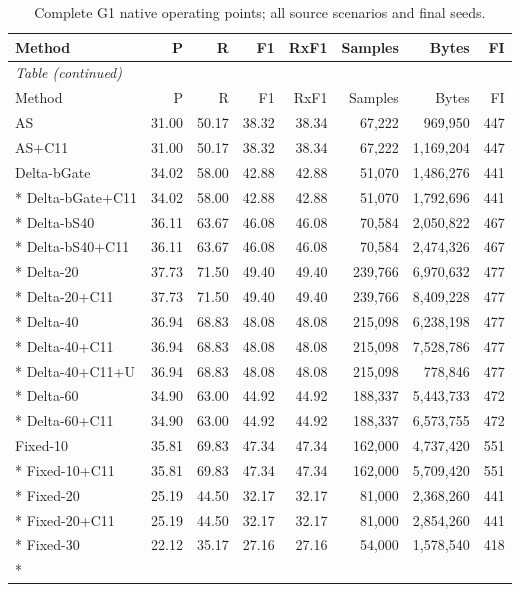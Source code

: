 \begin{small}\setlength{\tabcolsep}{3pt}\begin{longtable}{lrrrrrrr}
\caption{Complete G1 native operating points; all source scenarios and final seeds.}\label{tab:nativecomplete}\\
\toprule Method & P & R & F1 & RxF1 & Samples & Bytes & FI \\\midrule\endfirsthead\multicolumn{8}{l}{\textit{Table \thetable{} (continued)}}\\\toprule Method & P & R & F1 & RxF1 & Samples & Bytes & FI \\\midrule\endhead
AS & 31.00 & 50.17 & 38.32 & 38.34 & 67,222 & 969,950 & 447 \\
AS+C11 & 31.00 & 50.17 & 38.32 & 38.34 & 67,222 & 1,169,204 & 447 \\
Delta-bGate & 34.02 & 58.00 & 42.88 & 42.88 & 51,070 & 1,486,276 & 441 \\*
Delta-bGate+C11 & 34.02 & 58.00 & 42.88 & 42.88 & 51,070 & 1,792,696 & 441 \\*
Delta-bS40 & 36.11 & 63.67 & 46.08 & 46.08 & 70,584 & 2,050,822 & 467 \\*
Delta-bS40+C11 & 36.11 & 63.67 & 46.08 & 46.08 & 70,584 & 2,474,326 & 467 \\*
Delta-20 & 37.73 & 71.50 & 49.40 & 49.40 & 239,766 & 6,970,632 & 477 \\*
Delta-20+C11 & 37.73 & 71.50 & 49.40 & 49.40 & 239,766 & 8,409,228 & 477 \\*
Delta-40 & 36.94 & 68.83 & 48.08 & 48.08 & 215,098 & 6,238,198 & 477 \\*
Delta-40+C11 & 36.94 & 68.83 & 48.08 & 48.08 & 215,098 & 7,528,786 & 477 \\*
Delta-40+C11+U & 36.94 & 68.83 & 48.08 & 48.08 & 215,098 & 778,846 & 477 \\*
Delta-60 & 34.90 & 63.00 & 44.92 & 44.92 & 188,337 & 5,443,733 & 472 \\*
Delta-60+C11 & 34.90 & 63.00 & 44.92 & 44.92 & 188,337 & 6,573,755 & 472 \\
Fixed-10 & 35.81 & 69.83 & 47.34 & 47.34 & 162,000 & 4,737,420 & 551 \\*
Fixed-10+C11 & 35.81 & 69.83 & 47.34 & 47.34 & 162,000 & 5,709,420 & 551 \\*
Fixed-20 & 25.19 & 44.50 & 32.17 & 32.17 & 81,000 & 2,368,260 & 441 \\*
Fixed-20+C11 & 25.19 & 44.50 & 32.17 & 32.17 & 81,000 & 2,854,260 & 441 \\*
Fixed-30 & 22.12 & 35.17 & 27.16 & 27.16 & 54,000 & 1,578,540 & 418 \\*

\end{longtable}
\end{small}
